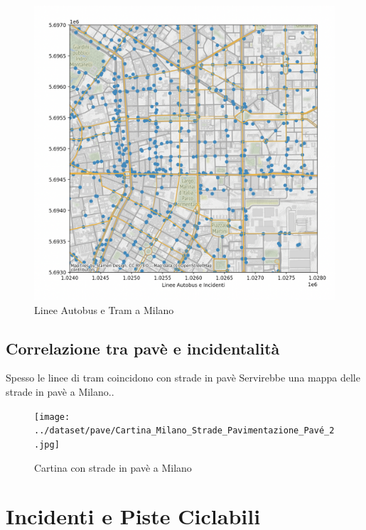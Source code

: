 \documentclass[a4paper]{report}
\begin{document}
\begin{figure}
    \includegraphics[width=\linewidth]{../src/atm/22_marzo.png}
    \caption{Linee Autobus e Tram a Milano}
    \label{fig:22_marzo}
\end{figure}



\subsection{Correlazione tra pavè e incidentalità}

Spesso le linee di tram coincidono con strade in pavè
Servirebbe una mappa delle strade in pavè a Milano..

\begin{figure}
    \texttt{[image: ../dataset/pave/Cartina\_Milano\_Strade\_Pavimentazione\_Pavé\_2.jpg]}
    \caption{Cartina con strade in pavè a Milano}
    \label{fig:pave_milano}
\end{figure}


\section{Incidenti e Piste  Ciclabili}

\end{document}
